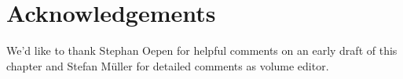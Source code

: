 \documentclass[output=paper,nonflat]{langsci/langscibook}
\begin{document}


\section*{Acknowledgements}

We'd like to thank Stephan Oepen for helpful comments on an early
draft of this chapter and Stefan M\"uller for detailed comments as
volume editor.

{\sloppy
\printbibliography[heading=subbibliography,notkeyword=this] 
}
\end{document}
